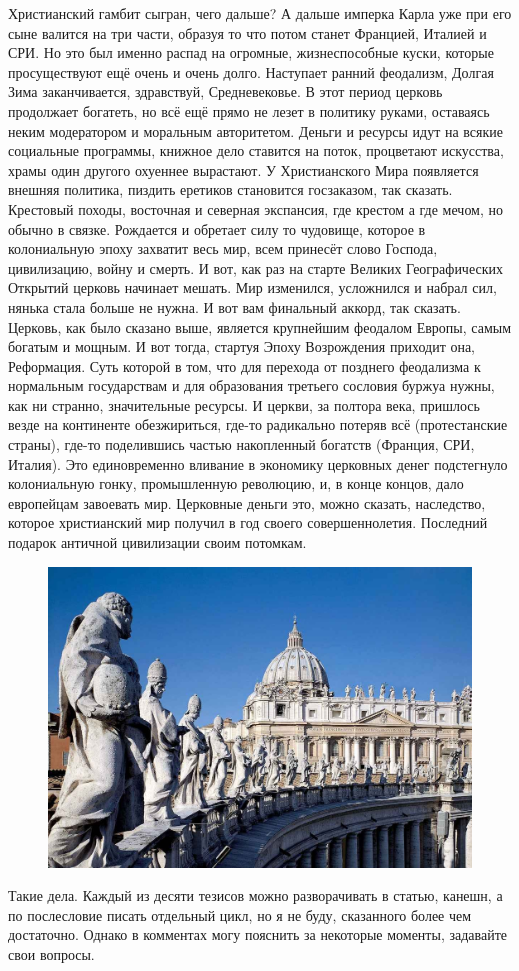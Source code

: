 Христианский гамбит сыгран, чего дальше? А дальше имперка Карла уже при его сыне валится на три части, образуя то что потом станет Францией, Италией и СРИ. Но это был именно распад на огромные, жизнеспособные куски, которые просуществуют ещё очень и очень долго. Наступает ранний феодализм, Долгая Зима заканчивается, здравствуй, Средневековье. В этот период церковь продолжает богатеть, но всё ещё прямо не лезет в политику руками, оставаясь неким модератором и моральным авторитетом. Деньги и ресурсы идут на всякие социальные программы, книжное дело ставится на поток, процветают искусства, храмы один другого охуеннее вырастают. У Христианского Мира появляется внешняя политика, пиздить еретиков становится госзаказом, так сказать. Крестовый походы, восточная и северная экспансия, где крестом а где мечом, но обычно в связке. Рождается и обретает силу то чудовище, которое в колониальную эпоху захватит весь мир, всем принесёт слово Господа, цивилизацию, войну и смерть. И вот, как раз на старте Великих Географических Открытий церковь начинает мешать. Мир изменился, усложнился и набрал сил, нянька стала больше не нужна. И вот вам финальный аккорд, так сказать. Церковь, как было сказано выше, является крупнейшим феодалом Европы, самым богатым и мощным. И вот тогда, стартуя Эпоху Возрождения приходит она, Реформация. Суть которой в том, что для перехода от позднего феодализма к нормальным государствам и для образования третьего сословия буржуа нужны, как ни странно, значительные ресурсы. И церкви, за полтора века, пришлось везде на континенте обезжириться, где-то радикально потеряв всё (протестанские страны), где-то поделившись частью накопленный богатств (Франция, СРИ, Италия). Это единовременно вливание в экономику церковных денег подстегнуло колониальную гонку, промышленную революцию, и, в конце концов, дало европейцам завоевать мир. Церковные деньги это, можно сказать, наследство, которое христианский мир получил в год своего совершеннолетия. Последний подарок античной цивилизации своим потомкам.
\begin{figure}[h!tb]
	\centering\includegraphics[scale=0.4]{Data/Relig_gambit/157293270319061829.png}
	\label{fig:gambit15} %
\end{figure}
Такие дела. Каждый из десяти тезисов можно разворачивать в статью, канешн, а по послесловие писать отдельный цикл, но я не буду, сказанного более чем достаточно. Однако в комментах могу пояснить за некоторые моменты, задавайте свои вопросы.
